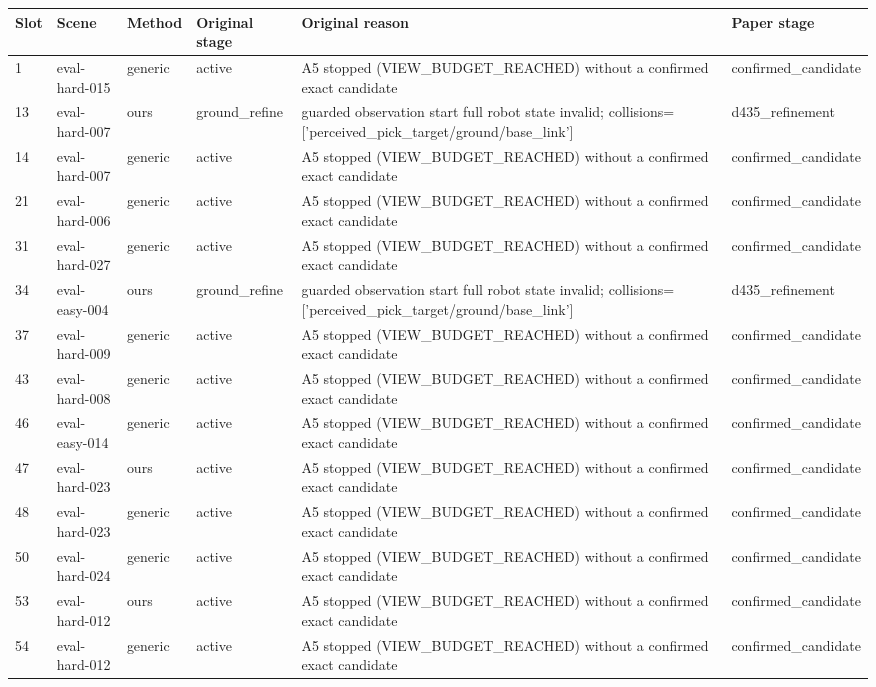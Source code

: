 \begin{tabular}{llllll}
\hline
Slot & Scene & Method & Original stage & Original reason & Paper stage \\
\hline
1 & eval-hard-015 & generic & active & A5 stopped (VIEW\_BUDGET\_REACHED) without a confirmed exact candidate & confirmed\_candidate \\
13 & eval-hard-007 & ours & ground\_refine & guarded observation start full robot state invalid; collisions=['perceived\_pick\_target/ground/base\_link'] & d435\_refinement \\
14 & eval-hard-007 & generic & active & A5 stopped (VIEW\_BUDGET\_REACHED) without a confirmed exact candidate & confirmed\_candidate \\
21 & eval-hard-006 & generic & active & A5 stopped (VIEW\_BUDGET\_REACHED) without a confirmed exact candidate & confirmed\_candidate \\
31 & eval-hard-027 & generic & active & A5 stopped (VIEW\_BUDGET\_REACHED) without a confirmed exact candidate & confirmed\_candidate \\
34 & eval-easy-004 & ours & ground\_refine & guarded observation start full robot state invalid; collisions=['perceived\_pick\_target/ground/base\_link'] & d435\_refinement \\
37 & eval-hard-009 & generic & active & A5 stopped (VIEW\_BUDGET\_REACHED) without a confirmed exact candidate & confirmed\_candidate \\
43 & eval-hard-008 & generic & active & A5 stopped (VIEW\_BUDGET\_REACHED) without a confirmed exact candidate & confirmed\_candidate \\
46 & eval-easy-014 & generic & active & A5 stopped (VIEW\_BUDGET\_REACHED) without a confirmed exact candidate & confirmed\_candidate \\
47 & eval-hard-023 & ours & active & A5 stopped (VIEW\_BUDGET\_REACHED) without a confirmed exact candidate & confirmed\_candidate \\
48 & eval-hard-023 & generic & active & A5 stopped (VIEW\_BUDGET\_REACHED) without a confirmed exact candidate & confirmed\_candidate \\
50 & eval-hard-024 & generic & active & A5 stopped (VIEW\_BUDGET\_REACHED) without a confirmed exact candidate & confirmed\_candidate \\
53 & eval-hard-012 & ours & active & A5 stopped (VIEW\_BUDGET\_REACHED) without a confirmed exact candidate & confirmed\_candidate \\
54 & eval-hard-012 & generic & active & A5 stopped (VIEW\_BUDGET\_REACHED) without a confirmed exact candidate & confirmed\_candidate \\

\end{tabular}

